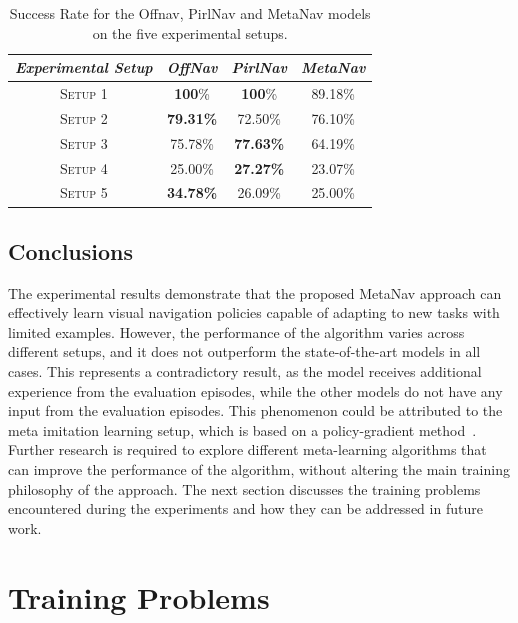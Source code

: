 \begin{table}
    \centering
    \begin{tabular}{c|ccc}
        \toprule
        \textit{Experimental Setup} & \textit{OffNav}  & \textit{PirlNav} & \textit{MetaNav} \\
        \midrule
        \textsc{Setup 1}            & \textbf{100}\%   & \textbf{100}\%   & 89.18\%          \\
        \textsc{Setup 2}            & \textbf{79.31\%} & 72.50\%          & 76.10\%          \\
        \textsc{Setup 3}            & 75.78\%          & \textbf{77.63\%} & 64.19\%          \\
        \textsc{Setup 4}            & 25.00\%          & \textbf{27.27\%} & 23.07\%          \\
        \textsc{Setup 5}            & \textbf{34.78\%} & 26.09\%          & 25.00\%          \\
        \bottomrule
    \end{tabular}
    \caption{Success Rate for the Offnav, PirlNav and MetaNav models on the five experimental setups.}
    \label{tab:metanav_comparison}
\end{table}

\subsection{Conclusions}\label{subsec:conclusions_metanav}

The experimental results demonstrate that the proposed MetaNav approach can effectively learn visual navigation policies capable of adapting to new tasks with limited examples.
However, the performance of the algorithm varies across different setups, and it does not outperform the state-of-the-art models in all cases.
This represents a contradictory result, as the model receives additional experience from the evaluation episodes, while the other models do not have any input from the evaluation episodes.
This phenomenon could be attributed to the meta imitation learning setup, which is based on a policy-gradient method~\cite{Beck_2025}.
Further research is required to explore different meta-learning algorithms that can improve the performance of the algorithm, without altering the main training philosophy of the approach.
The next section discusses the training problems encountered during the experiments and how they can be addressed in future work.

\section{Training Problems}\label{sec:training-problems}

